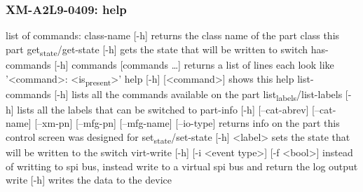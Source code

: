 \documentclass[11pt]{article}
\begin{document}
\subsubsection{XM-A2L9-0409: help}
\label{sec:org2f88b63}
list of commands:
  class-name [-h]
    returns the class name of the part class this part
  get\textsubscript{state}/get-state [-h]
    gets the state that will be written to switch
  has-commands [-h] commands [commands \ldots{}]
    returns a list of lines each look like '<command>: <is\textsubscript{present}>'
  help [-h] [<command>]
    shows this help
  list-commands [-h]
    lists all the commands available on the part
  list\textsubscript{labels}/list-labels [-h]
    lists all the labels that can be switched to
  part-info  [-h] [--cat-abrev] [--cat-name] [--xm-pn] [--mfg-pn] [--mfg-name]
          [--io-type]
    returns info on the part this control screen was designed for
  set\textsubscript{state}/set-state [-h] <label>
    sets the state that will be written to the switch
  virt-write [-h] [-i <event type>] [-f <bool>]
    instead of writting to spi bus, instead write to a virtual spi bus
    and return the log output
  write [-h]
    writes the data to the device
\end{document}
